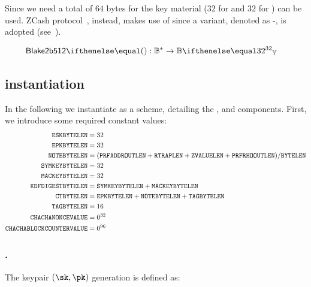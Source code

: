 Since we need a total of $64$ bytes for the key material ($32$ for  and $32$ for )  can be used. ZCash protocol~\cite[Section 5.4.3]{zcashprotocol}, instead, makes use of  since a \dhaes{} variant, denoted as -, is adopted (see~\cite[Section 2.8]{langley2018chacha20}).

\begin{align*}
    \blake{2b512}{}&: \BB^{*} \to \BBy{32}
\end{align*}

\subsection{\encscheme{} instantiation}\label{instantiation:enc:enc-sch}

In the following we instantiate \encscheme{} as a \dhaes{} scheme, detailing the \kgen{}, \enc{} and \dec{} components. First, we introduce some required constant values:
\begin{align*}
    \mathtt{ESKBYTELEN} &= 32\\
    \mathtt{EPKBYTELEN} &= 32\\
    \mathtt{NOTEBYTELEN} &= (\mathtt{PRFADDROUTLEN} + \mathtt{RTRAPLEN} + \mathtt{ZVALUELEN} + \mathtt{PRFRHOOUTLEN}) / \mathtt{BYTELEN}\\
    \mathtt{SYMKEYBYTELEN} &= 32\\
    \mathtt{MACKEYBYTELEN} &= 32\\
    \mathtt{KDFDIGESTBYTELEN} &= \mathtt{SYMKEYBYTELEN} + \mathtt{MACKEYBYTELEN}\\
    \mathtt{CTBYTELEN} &= \mathtt{EPKBYTELEN} + \mathtt{NOTEBYTELEN} + \mathtt{TAGBYTELEN}\\
    \mathtt{TAGBYTELEN} &= 16\\
    \mathtt{CHACHANONCEVALUE} &= 0^{32}\\
    \mathtt{CHACHABLOCKCOUNTERVALUE} &= 0^{96}\\
\end{align*}

\subsubsection{\encscheme.\kgen{}}

The keypair $(\sk, \pk)$ generation is defined as:

